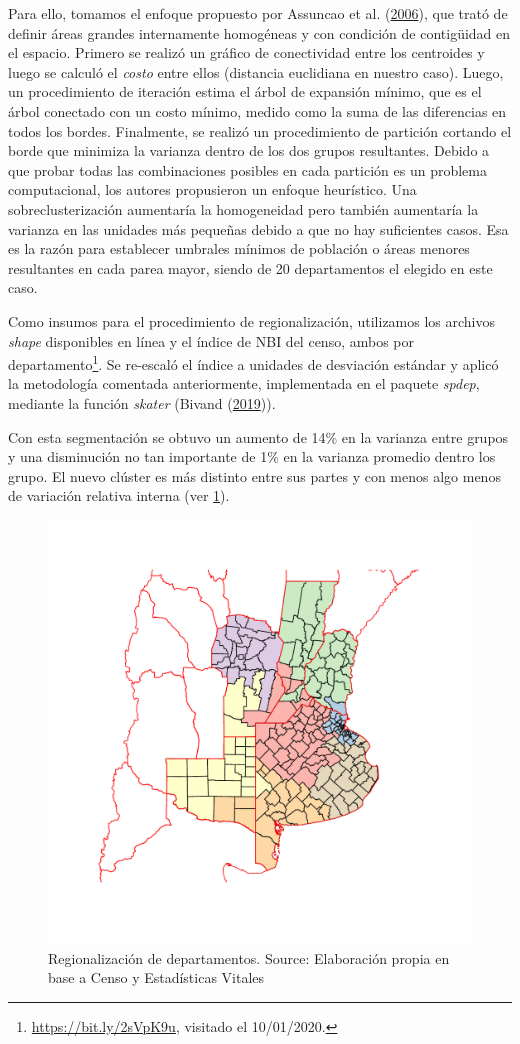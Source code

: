 \documentclass[12pt,]{article}
\begin{document}
Para ello, tomamos el enfoque propuesto por Assuncao et al.
(\protect\hyperlink{ref-AssunCao2006}{2006}), que trató de definir áreas
grandes internamente homogéneas y con condición de contigüidad en el
espacio. Primero se realizó un gráfico de conectividad entre los
centroides y luego se calculó el \emph{costo} entre ellos (distancia
euclidiana en nuestro caso). Luego, un procedimiento de iteración estima
el árbol de expansión mínimo, que es el árbol conectado con un costo
mínimo, medido como la suma de las diferencias en todos los bordes.
Finalmente, se realizó un procedimiento de partición cortando el borde
que minimiza la varianza dentro de los dos grupos resultantes. Debido a
que probar todas las combinaciones posibles en cada partición es un
problema computacional, los autores propusieron un enfoque heurístico.
Una sobreclusterización aumentaría la homogeneidad pero también
aumentaría la varianza en las unidades más pequeñas debido a que no hay
suficientes casos. Esa es la razón para establecer umbrales mínimos de
población o áreas menores resultantes en cada parea mayor, siendo de 20
departamentos el elegido en este caso.

Como insumos para el procedimiento de regionalización, utilizamos los
archivos \emph{shape} disponibles en línea y el índice de NBI del censo,
ambos por departamento\footnote{\url{https://bit.ly/2sVpK9u}, visitado
  el 10/01/2020.}. Se re-escaló el índice a unidades de desviación
estándar y aplicó la metodología comentada anteriormente, implementada
en el paquete \emph{spdep}, mediante la función \emph{skater} (Bivand
(\protect\hyperlink{ref-Bivand2019}{2019})).

Con esta segmentación se obtuvo un aumento de 14\% en la varianza entre
grupos y una disminución no tan importante de 1\% en la varianza
promedio dentro los grupo. El nuevo clúster es más distinto entre sus
partes y con menos algo menos de variación relativa interna (ver
\ref{fig:cluster}).

\begin{figure}

{\centering \includegraphics[width=0.7\linewidth]{plots/cluster} 

}

\caption{Regionalización de departamentos. Source: Elaboración propia en base a Censo y Estadísticas Vitales}\label{fig:cluster}
\end{figure}
\end{document}
